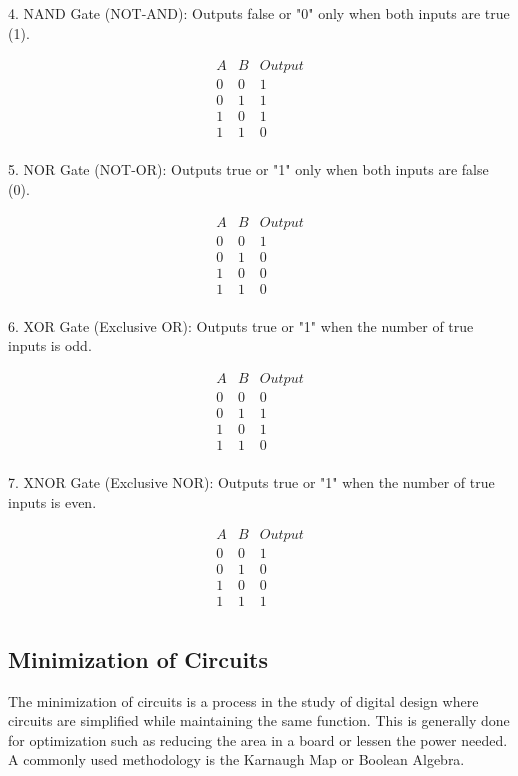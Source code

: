 4. NAND Gate (NOT-AND): Outputs false or "0" only when both inputs are true (1).

\[
\begin{align*}
A & B & Output \\
0 & 0 & 1 \\
0 & 1 & 1 \\
1 & 0 & 1 \\
1 & 1 & 0 \\
\end{align*}
\]

5. NOR Gate (NOT-OR): Outputs true or "1" only when both inputs are false (0).

\[
\begin{align*}
A & B & Output \\
0 & 0 & 1 \\
0 & 1 & 0 \\
1 & 0 & 0 \\
1 & 1 & 0 \\
\end{align*}
\]

6. XOR Gate (Exclusive OR): Outputs true or "1" when the number of true inputs is odd.

\[
\begin{align*}
A & B & Output \\
0 & 0 & 0 \\
0 & 1 & 1 \\
1 & 0 & 1 \\
1 & 1 & 0 \\
\end{align*}
\]

7. XNOR Gate (Exclusive NOR): Outputs true or "1" when the number of true inputs is even.

\[
\begin{align*}
A & B & Output \\
0 & 0 & 1 \\
0 & 1 & 0 \\
1 & 0 & 0 \\
1 & 1 & 1 \\
\end{align*}
\]

\subsection{Minimization of Circuits}
The minimization of circuits is a process in the study of digital design where circuits are simplified while maintaining the same function. This is generally done for optimization such as reducing the area in a board or lessen the power needed. A commonly used methodology is the Karnaugh Map or Boolean Algebra.

